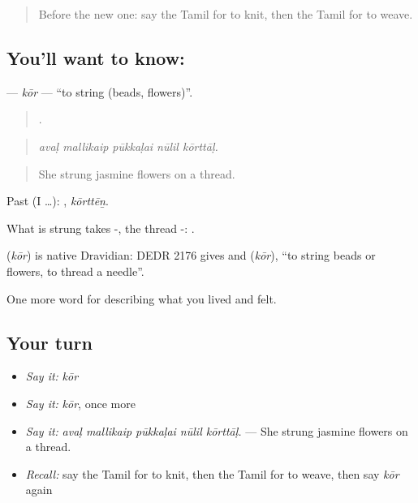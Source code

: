 \label{lesson:TA-C538-kor}



\begin{quote}
Before the new one: say the Tamil for to knit, then the Tamil for to weave.
\end{quote}

\subsection*{You'll want to know: }
\textbf{} — \emph{kōr} — \textquotedblleft{}to string (beads, flowers)\textquotedblright{}.

\begin{quote}
    .
\end{quote}

\begin{quote}
\emph{avaḷ mallikaip pūkkaḷai nūlil kōrttāḷ.}
\end{quote}

\begin{quote}
She strung jasmine flowers on a thread.
\end{quote}

Past (I …): , \emph{kōrttēṉ}.

What is strung takes -, the thread -:   .

\begin{cousinweb}
\textbf{} (\emph{kōr}) is native Dravidian: DEDR 2176 gives  and  (\emph{kōr}), \textquotedblleft{}to string beads or flowers, to thread a needle\textquotedblright{}.
\end{cousinweb}

\begin{grammarlens}[title={What you've built}]
One more word for describing what you lived and felt.
\end{grammarlens}

\subsection*{Your turn}
\begin{itemize}
\raggedright
  \item \emph{Say it:} \emph{kōr}
  \item \emph{Say it:} \emph{kōr}, once more
  \item \emph{Say it:} \emph{avaḷ mallikaip pūkkaḷai nūlil kōrttāḷ.} — She strung jasmine flowers on a thread.
  \item \emph{Recall:} say the Tamil for to knit, then the Tamil for to weave, then say \emph{kōr} again
\end{itemize}

